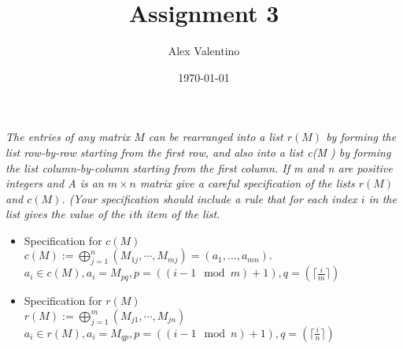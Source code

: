 \documentclass[12pt, letterpaper]{article}
\date{\today}
\author{Alex Valentino}
\title{Assignment 3}
\begin{document}
	\textit{The entries of any matrix $M$ can be rearranged into a list $r(M)$ by forming the list row-by-row
starting from the first row, and also into a list c(M ) by forming the list column-by-column
starting from the first column. If m and n are positive integers and A is an $m\times n$ matrix
give a careful specification of the lists $r(M)$ and $c(M )$. (Your specification should include a
rule that for each index $i$ in the list gives the value of the $i$th item of the list.}\\
\begin{itemize}
	\item Specification for $c(M)$\\
	$c(M) := \displaystyle \bigoplus_{j=1}^n (M_{1j},\cdots,M_{mj}) = (a_1,...,a_{mn}).$
	$a_i \in c(M), a_i = M_{pq}, p = ((i-1 \mod m) + 1), q = (\lceil \frac{i}{m} \rceil)$
	\item Specification for $r(M)$\\
	$r(M) := \displaystyle \bigoplus_{j=1}^m (M_{j1},\cdots, M_{jn})$
	$a_i \in r(M), a_i = M_{qp}, p = ((i-1 \mod n) + 1), q = (\lceil \frac{i}{n} \rceil)$
	
\end{itemize}
	
\end{document}
